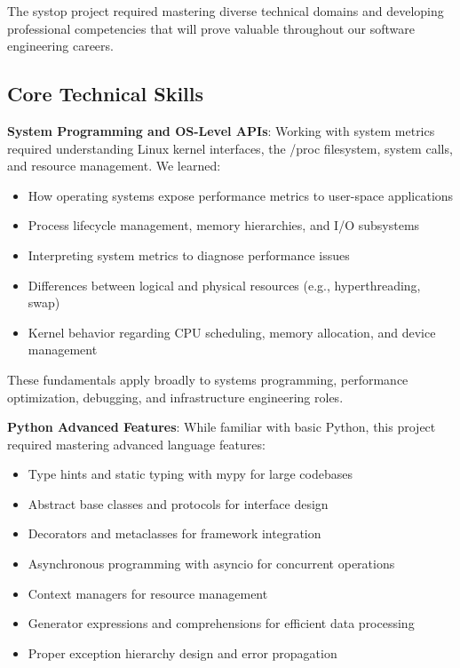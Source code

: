 \documentclass[12pt,a4paper,oneside]{report}
\begin{document}
The systop project required mastering diverse technical domains and developing professional competencies that will prove valuable throughout our software engineering careers.

\subsection{Core Technical Skills}

\textbf{System Programming and OS-Level APIs}: Working with system metrics required understanding Linux kernel interfaces, the /proc filesystem, system calls, and resource management. We learned:

\begin{itemize}
    \item How operating systems expose performance metrics to user-space applications
    \item Process lifecycle management, memory hierarchies, and I/O subsystems
    \item Interpreting system metrics to diagnose performance issues
    \item Differences between logical and physical resources (e.g., hyperthreading, swap)
    \item Kernel behavior regarding CPU scheduling, memory allocation, and device management
\end{itemize}

These fundamentals apply broadly to systems programming, performance optimization, debugging, and infrastructure engineering roles.

\textbf{Python Advanced Features}: While familiar with basic Python, this project required mastering advanced language features:

\begin{itemize}
    \item Type hints and static typing with mypy for large codebases
    \item Abstract base classes and protocols for interface design
    \item Decorators and metaclasses for framework integration
    \item Asynchronous programming with asyncio for concurrent operations
    \item Context managers for resource management
    \item Generator expressions and comprehensions for efficient data processing
    \item Proper exception hierarchy design and error propagation
\end{itemize}
\end{document}
